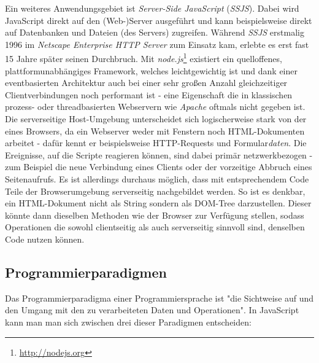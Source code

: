 Ein weiteres Anwendungsgebiet ist \emph{Server-Side JavaScript} (\emph{SSJS}). Dabei wird JavaScript
direkt auf den (Web-)Server ausgeführt und kann beispielsweise direkt auf Datenbanken und Dateien
(des Servers) zugreifen. Während \emph{SSJS} erstmalig 1996 im \emph{Netscape Enterprise HTTP Server}
zum Einsatz kam, erlebte es erst fast 15 Jahre später seinen Durchbruch. Mit
\emph{node.js}\footnote{\href{http://nodejs.org}{http://nodejs.org}} existiert ein quelloffenes,
plattformunabhängiges Framework, welches leichtgewichtig ist und dank einer eventbasierten Architektur
auch bei einer sehr großen Anzahl gleichzeitiger Clientverbindungen noch performant ist - eine
Eigenschaft die in klassischen prozess- oder threadbasierten Webservern wie \emph{Apache} oftmals
nicht gegeben ist. Die serverseitige Host-Umgebung unterscheidet sich logischerweise stark von der
eines Browsers, da ein Webserver weder mit Fenstern noch HTML-Dokumenten arbeitet - dafür kennt er
beispielsweise HTTP-Requests und Formular\emph{daten}. Die Ereignisse, auf die Scripte reagieren
können, sind dabei primär netzwerkbezogen - zum Beispiel die neue Verbindung eines Clients oder
der vorzeitige Abbruch eines Seitenaufrufs. Es ist allerdings durchaus möglich, dass mit
entsprechendem Code Teile der Browserumgebung serverseitig nachgebildet werden. So ist es denkbar,
ein HTML-Dokument nicht als String sondern als DOM-Tree darzustellen. Dieser könnte dann dieselben
Methoden wie der Browser zur Verfügung stellen, sodass Operationen die sowohl clientseitig als auch
serverseitig sinnvoll sind, denselben Code nutzen können.


\subsection{Programmierparadigmen}

Das Programmierparadigma einer Programmiersprache ist "die Sichtweise auf und den Umgang mit den zu
verarbeiteten Daten und Operationen". \citep[Kap. 1.3.1]{progsprachen}
In JavaScript kann man man sich zwischen drei dieser Paradigmen entscheiden:

